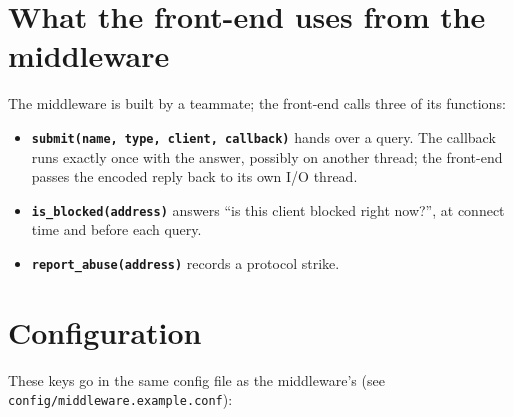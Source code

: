 \documentclass[11pt,a4paper]{article}
\begin{document}
\section{What the front-end uses from the middleware}

The middleware is built by a teammate; the front-end calls three of its functions:

\begin{itemize}
  \item \textbf{\texttt{submit(name, type, client, callback)}} hands over a query. The callback
        runs exactly once with the answer, possibly on another thread; the front-end passes the
        encoded reply back to its own I/O thread.
  \item \textbf{\texttt{is\_blocked(address)}} answers ``is this client blocked right now?'', at
        connect time and before each query.
  \item \textbf{\texttt{report\_abuse(address)}} records a protocol strike.
\end{itemize}

\section{Configuration}

These keys go in the same config file as the middleware's (see
\texttt{config/middleware.example.conf}):
\end{document}
